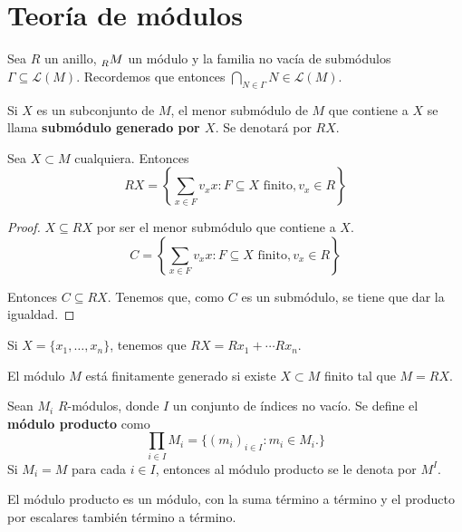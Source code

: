 \section{Teoría de módulos}

Sea \(R\) un anillo, \(\prescript{}{R}{M}\) un módulo y la
familia no vacía de submódulos
\(\Gamma\subseteq\mathcal{L}(M)\). Recordemos que entonces
\(\bigcap_{N\in\Gamma} N\in\mathcal{L}(M)\).

\begin{df}
  Si \(X\) es un subconjunto de \(M\), el menor submódulo de \(M\) que contiene
  a \(X\) se llama \textbf{submódulo generado por \(X\)}. Se denotará por \(RX\).
\end{df}

\begin{lema}
  Sea \(X \subset M\) cualquiera. Entonces
  \[
    RX=\left\{\sum_{x\in F}v_x x:F\subseteq X \textrm{ finito}, v_x\in
    R\right\}
  \]
\end{lema}
\begin{proof}
  \(X\subseteq RX\) por ser el menor submódulo que contiene a \(X\).
  \[
    C=\left\{\sum_{x\in F}v_x x:F\subseteq X \textrm{ finito}, v_x\in
    R\right\}
  \]

  Entonces \(C\subseteq RX\).
  Tenemos que, como \(C\) es un submódulo, se tiene que dar la igualdad.

\end{proof}

Si \(X=\{x_1,\ldots, x_n\}\), tenemos que \(RX=Rx_1+\cdots Rx_n\).

\begin{obs}
  El módulo \(M\) está finitamente generado si existe \(X \subset M\) finito
  tal que \(M = RX\).
\end{obs}

\begin{df}
  Sean \(M_i\) \(R\)-módulos, donde \(I\) un conjunto de índices no vacío.
  Se define el \textbf{módulo producto} como
  \[
    \prod_{i\in I} M_i=\{{(m_i)}_{i\in I}:m_i\in M_i.\}
  \]
  Si \(M_i = M\) para cada \(i \in I\), entonces al módulo producto se le
  denota por \(M^I\).
\end{df}

\begin{prop}
  El módulo producto es un módulo, con la suma término a término y el
  producto por escalares también término a término.
\end{prop}

